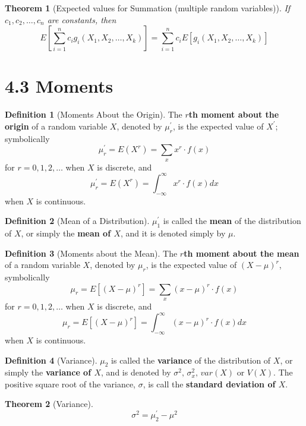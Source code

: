 \documentclass[
10pt,reqno
]{amsart}
\newtheorem{theorem}{Theorem}[section]
\theoremstyle{definition}
\newtheorem{definition}{Definition}[section]
\begin{document}
\begin{theorem}[Expected values for Summation (multiple random variables)]
\label{thm:ExpectedValuesSumMultRV}
If \(c_1, c_2, \ldots , c_n\) are constants, then 
\[
E \left [ \sum_{i=1}^n c_i g_i (X_1, X_2, \ldots, X_k)\right ] = \sum_{i=1}^n c_i E[g_i(X_1, X_2, \ldots, X_k)]
\]
\end{theorem}

\section*{4.3 Moments}

\begin{definition}[Moments About the Origin]
The \textbf{\(r\)th moment about the origin} of a random variable \(X\), denoted by \(\mu_r^{'}\), is the expected value of \(X^{'}\); symbolically
\[
\mu_r^{'} = E(X^r)=\sum_x x^r \cdot f(x)
\]
for \(r=0,1,2,\ldots\) when \(X\) is discrete, and
\[
\mu_r^{'}=E(X^r)=\int_{- \infty}^{\infty} x^r \cdot f(x) dx
\]
when \(X\) is continuous.
\end{definition}

\begin{definition}[Mean of a Distribution]
\(\mu_1^{'}\) is called the \textbf{mean} of the distribution of \(X\), or simply the \textbf{mean of \(X\)}, and it is denoted simply by \(\mu\).
\end{definition}

\begin{definition}[Moments about the Mean]
\label{dfn:MomentsAboutMean}
The \textbf{\(r\)th moment about the mean} of a random variable \(X\), denoted by \(\mu_r\), is the expected value of \((X-\mu)^r\), symbolically
\[
\mu_r = E[(X-\mu)^r]=\sum_x (x-\mu)^r \cdot f(x)
\]
for \(r=0,1,2,\ldots\) when \(X\) is discrete, and
\[
\mu_r=E[(X-\mu)^r]=\int_{- \infty}^{\infty} (x-\mu)^r \cdot f(x) dx
\]
when \(X\) is continuous.
\end{definition}

\begin{definition}[Variance]
\label{dfn:Variance}
\(\mu_2\) is called the \textbf{variance} of the distribution of \(X\), or simply the \textbf{variance of \(X\)}, and is denoted by \(\sigma^2, \, \sigma_x^2, \, var(X)\) or \(V(X)\). The positive square root of the variance, \(\sigma\), is call the \textbf{standard deviation of \(X\)}.
\end{definition}

\begin{theorem}[Variance]
\[
\sigma^2 = \mu_2^{'}-\mu^2
\]
\end{theorem}
\end{document}
